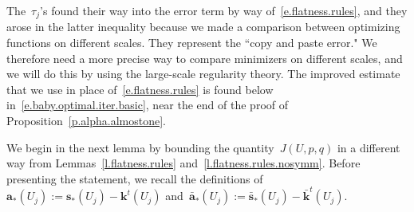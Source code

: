 \documentclass[11pt,twoside]{article} %
\numberwithin{equation}{section}
\theoremstyle{definition}
\newcommand{\s}{\mathbf{s}}
\renewcommand{\a}{\mathbf{a}}
\renewcommand{\k}{\mathbf{k}}
\newcommand{\ahom}{\bar{\a}}
\newcommand{\shom}{\bar{\mathbf{s}}}
\newcommand{\khom}{\bar{\mathbf{k}}}
\begin{document}
\smallskip

The~$\tau_j$'s found their way into the error term by way of~\eqref{e.flatness.rules}, and they arose in the latter inequality because we made a comparison between optimizing functions on different scales. They represent the ``copy and paste error." We therefore need a more precise way to compare minimizers on different scales, and we will do this by using the large-scale regularity theory. 
The improved estimate that we use in place of~\eqref{e.flatness.rules} is found below in~\eqref{e.baby.optimal.iter.basic}, near the end of the proof of Proposition~\ref{p.alpha.almostone}. 

\smallskip

We begin in the next lemma by bounding the quantity~$J(U,p,q)$ in a different way from Lemmas~\ref{l.flatness.rules} and~\ref{l.flatness.rules.nosymm}. 
Before presenting the statement, we recall the definitions of~$\a_*(U_j):= \s_*(U_j) - \k^t(U_j)$ and~$\ahom_*(U_j):= \shom_*(U_j) - \khom^t(U_j)$.
\end{document}
